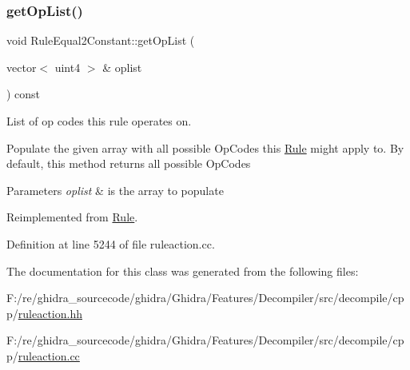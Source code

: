 \subsubsection{\texorpdfstring{getOpList()}{getOpList()}}
{\footnotesize\ttfamily void Rule\+Equal2\+Constant\+::get\+Op\+List (\begin{DoxyParamCaption}\item[{vector$<$ uint4 $>$ \&}]{oplist }\end{DoxyParamCaption}) const\hspace{0.3cm}{\ttfamily [virtual]}}



List of op codes this rule operates on. 

Populate the given array with all possible Op\+Codes this \mbox{\hyperlink{class_rule}{Rule}} might apply to. By default, this method returns all possible Op\+Codes 
\begin{DoxyParams}{Parameters}
{\em oplist} & is the array to populate \\
\hline
\end{DoxyParams}


Reimplemented from \mbox{\hyperlink{class_rule_a4023bfc7825de0ab866790551856d10e}{Rule}}.



Definition at line 5244 of file ruleaction.\+cc.



The documentation for this class was generated from the following files\+:\begin{DoxyCompactItemize}
\item 
F\+:/re/ghidra\+\_\+sourcecode/ghidra/\+Ghidra/\+Features/\+Decompiler/src/decompile/cpp/\mbox{\hyperlink{ruleaction_8hh}{ruleaction.\+hh}}\item 
F\+:/re/ghidra\+\_\+sourcecode/ghidra/\+Ghidra/\+Features/\+Decompiler/src/decompile/cpp/\mbox{\hyperlink{ruleaction_8cc}{ruleaction.\+cc}}\end{DoxyCompactItemize}
